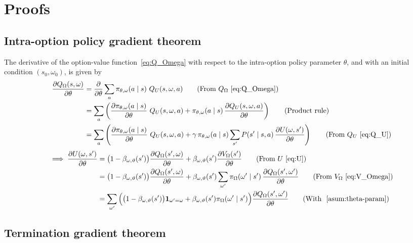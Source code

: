\section{Proofs}

\subsection{Intra-option policy gradient theorem~\cite{bacon2017option}}

The derivative of the option-value function~\eqref{eq:Q_Omega} with respect to the intra-option policy parameter \( \theta \), and with an initial condition \( (s_0, \omega_0) \), is given by
\begin{align}
    \frac{\partial Q_\Omega(s, \omega)}{\partial \theta}
     & =
    \frac{\partial}{\partial \theta} \sum_{a} \pi_{\theta, \omega}(a \mid s) \ Q_U(s, \omega, a)
    \tag{From \( Q_\Omega \)~\eqref{eq:Q_Omega}}
    \\ & =
    \sum_{a} \left( \frac{\partial \pi_{\theta, \omega}(a \mid s)}{\partial \theta}  \ Q_U(s, \omega, a) + \pi_{\theta, \omega}(a \mid s) \, \frac{\partial Q_U(s, \omega, a)}{\partial \theta} \right)
    \tag{Product rule}
    \\ & =
    \sum_{a} \left( \frac{\partial \pi_{\theta, \omega}(a \mid s)}{\partial \theta}  \ Q_U(s, \omega, a) + \gamma \, \pi_{\theta, \omega}(a \mid s) \sum_{s'} P(s' \mid s, a) \, \frac{\partial U(\omega, s')}{\partial \theta} \right)
    \tag{From \( Q_U \)~\eqref{eq:Q_U}}
\end{align}
\begin{align}
    \implies
    \frac{\partial U(\omega, s')}{\partial \theta}
     & =
    \big( 1 - \beta_{\omega, \vartheta}(s') \big) \frac{\partial Q_\Omega(s', \omega)}{\partial \theta} + \beta_{\omega, \vartheta}(s') \frac{\partial V_\Omega(s')}{\partial \theta}
    \tag{From \( U \)~\eqref{eq:U}}
    \\ & =
    \big( 1 - \beta_{\omega, \vartheta}(s') \big) \frac{\partial Q_\Omega(s', \omega)}{\partial \theta} + \beta_{\omega, \vartheta}(s') \sum_{\omega'} \pi_\Omega(\omega' \mid s') \, \frac{\partial Q_\Omega(s', \omega')}{\partial \theta}
    \tag{From \( V_\Omega \)~\eqref{eq:V_Omega}}
    \\ & =
    \sum_{\omega'} \Big( \big( 1 - \beta_{\omega, \vartheta}(s') \big) \mathbf{1}_{\omega' = \omega} + \beta_{\omega, \vartheta}(s') \pi_\Omega(\omega' \mid s') \Big) \frac{\partial Q_\Omega(s', \omega')}{\partial \theta}
    \tag{With ~\ref{asum:theta-param}}
\end{align}

\subsection{Termination gradient theorem~\cite{bacon2017option}}
